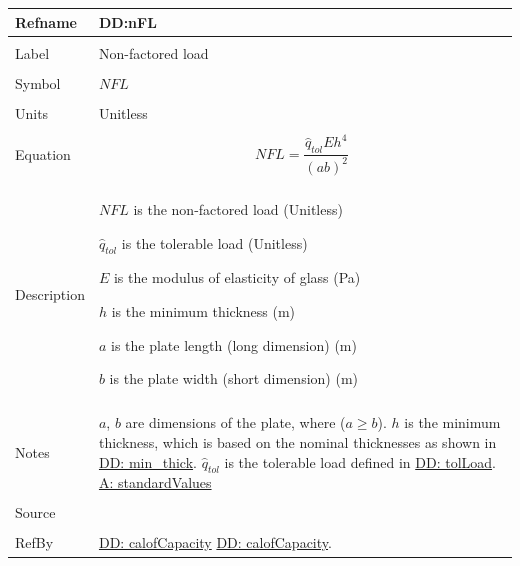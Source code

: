 \documentclass[12pt]{article}
\begin{document}
\noindent \begin{minipage}{\textwidth}
\begin{tabular}{p{} p{}}
\toprule \textbf{Refname} & \textbf{DD:nFL}
\label{DD:nFL}
\\ \midrule \\
Label & Non-factored load
\\ \midrule \\
Symbol & $NFL$
\\ \midrule \\
Units & Unitless
\\ \midrule \\
Equation & \begin{dmath}
           NFL=\frac{{\hat{q}_{tol}} E h^{4}}{\left(a b\right)^{2}}
           \end{dmath}
\\ \midrule \\
Description & \begin{symbDescription}
              \item{$NFL$ is the non-factored load (Unitless)}
              \item{${\hat{q}_{tol}}$ is the tolerable load (Unitless)}
              \item{$E$ is the modulus of elasticity of glass (Pa)}
              \item{$h$ is the minimum thickness (m)}
              \item{$a$ is the plate length (long dimension) (m)}
              \item{$b$ is the plate width (short dimension) (m)}
              \end{symbDescription}
\\ \midrule \\
Notes & $a$, $b$ are dimensions of the plate, where ($a\geq{}b$).
        $h$ is the minimum thickness, which is based on the nominal thicknesses as shown in \hyperref[DD:min.thick]{DD: min\_thick}.
        ${\hat{q}_{tol}}$ is the tolerable load defined in \hyperref[DD:tolLoad]{DD: tolLoad}.
        \hyperref[A:standardValues]{A: standardValues}
\\ \midrule \\
Source & \cite{astm2009}
\\ \midrule \\
RefBy & \hyperref[DD:calofCapacity]{DD: calofCapacity} \hyperref[DD:calofCapacity]{DD: calofCapacity}.
\\ \bottomrule \end{tabular}
\end{minipage}\\
\end{document}
